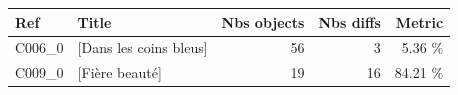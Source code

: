 \begin{small}
\begin{tabular}{l|l|r|r|r}
\textbf{Ref} & \textbf{Title} & \textbf{Nbs objects} &  \textbf{Nbs diffs} & \textbf{Metric} \\ \hline
	C006\_0 & [Dans les coins bleus]  & 56 & 3 & 5.36 \% \\ 
		C009\_0 & [Fière beauté]  & 19 & 16 & 84.21 \% \\ 
		\hline
\end{tabular}
\end{small}
	